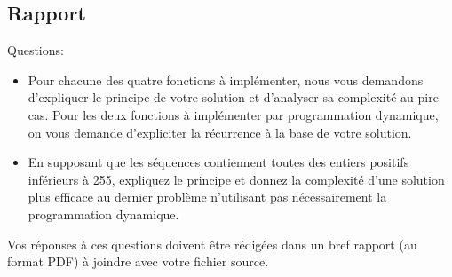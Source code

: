 \documentclass[a4paper,10pt]{article}
\begin{document}
\subsection*{Rapport}

Questions:
\begin{itemize}
\item Pour chacune des quatre fonctions à implémenter, nous vous demandons
d'expliquer le principe de votre solution et d'analyser sa complexité
au pire cas. Pour les deux fonctions à implémenter par programmation
dynamique, on vous demande d'expliciter la récurrence à la
base de votre solution.
\item En supposant que les séquences contiennent toutes des entiers
  positifs inférieurs à 255, expliquez le principe et donnez la
  complexité d'une solution plus efficace au dernier problème
  n'utilisant pas nécessairement la programmation dynamique.
\end{itemize}

Vos réponses à ces questions doivent être rédigées dans un bref rapport (au format
PDF) à joindre avec votre fichier source.
\end{document}
